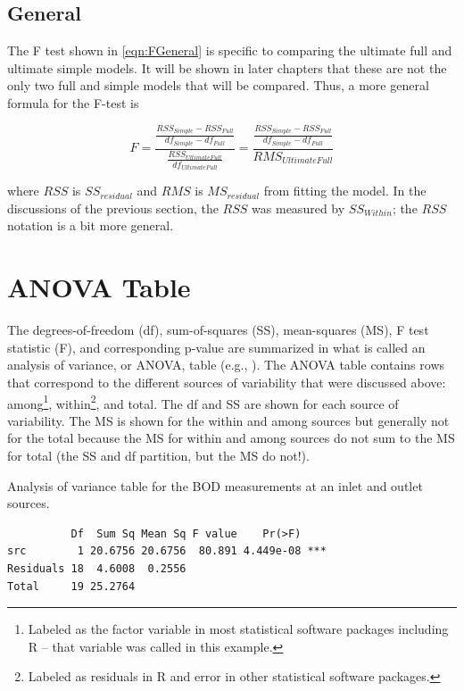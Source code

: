 \documentclass[10pt,openany]{book}\usepackage[]{graphicx}\usepackage[]{color}
\begin{document}

\subsection{General}
The F test shown in \eqref{eqn:FGeneral} is specific to comparing the ultimate full and ultimate simple models.  It will be shown in later chapters that these are not the only two full and simple models that will be compared.  Thus, a more general formula for the F-test is

\begin{equation} \label{eqn:FModelGeneral}
  F = \frac{\frac{RSS_{Simple}-RSS_{Full}}{df_{Simple}-df_{Full}}}{\frac{RSS_{Ultimate Full}}{df_{Ultimate Full}}} = \frac{\frac{RSS_{Simple}-RSS_{Full}}{df_{Simple}-df_{Full}}}{RMS_{Ultimate Full}}
\end{equation}

where $RSS$ is $SS_{residual}$ and $RMS$ is $MS_{residual}$ from fitting the model.  In the discussions of the previous section, the $RSS$ was measured by $SS_{Within}$; the $RSS$ notation is a bit more general.

\section{ANOVA Table}
The degrees-of-freedom (df), sum-of-squares (SS), mean-squares (MS), F test statistic (F), and corresponding p-value are summarized in what is called an analysis of variance, or ANOVA, table (e.g., ).  The ANOVA table contains rows that correspond to the different sources of variability that were discussed above: among\footnote{Labeled as the factor variable in most statistical software packages including R -- that variable was called  in this example.}, within\footnote{Labeled as residuals in R and error in other statistical software packages.}, and total.  The df and SS are shown for each source of variability.  The MS is shown for the within and among sources but generally not for the total because the MS for within and among sources do not sum to the MS for total (the SS and df partition, but the MS do not!).

\begin{table}[h]
  \centering
  \caption{Analysis of variance table for the BOD measurements at an inlet and outlet sources.}\label{tab:ANOVABOD1}
  \begin{Verbatim}
          Df  Sum Sq Mean Sq F value    Pr(>F)
src        1 20.6756 20.6756  80.891 4.449e-08 ***
Residuals 18  4.6008  0.2556
Total     19 25.2764
  \end{Verbatim}
\end{table}
\end{document}

